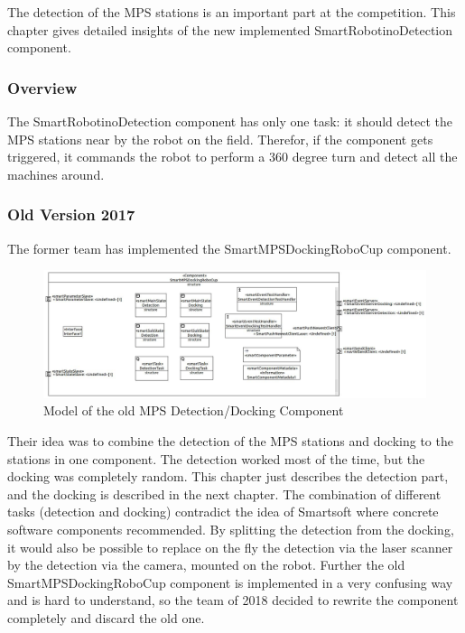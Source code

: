 The detection of the MPS stations is an important part at the competition. This chapter gives detailed insights of the new implemented SmartRobotinoDetection component. 


\subsubsection{Overview}

The SmartRobotinoDetection component has only one task: it should detect the MPS stations near by the robot on the field. Therefor, if the component gets triggered, it commands the robot to perform a 360 degree turn and detect all the machines around.

\subsubsection{Old Version 2017}
The former team has implemented the SmartMPSDockingRoboCup component. 

\begin{figure}[h]
\centering
\includegraphics[scale=0.4]{pic/SmartMPSDockingRoboCup.jpg}
\caption{Model of the old MPS Detection/Docking Component}
\label{fig:dockingold_overview}
\end{figure}

Their idea was to combine the detection of the MPS stations and docking to the stations in one component. The detection worked most of the time, but the docking was completely random. This chapter just describes the detection part, and the docking is described in the next chapter. 
The combination of different tasks (detection and docking) contradict the idea of Smartsoft where concrete software components recommended. By splitting the detection from the docking, it would also be possible to replace on the fly the detection via the laser scanner by the detection via the camera, mounted on the robot.
Further the old SmartMPSDockingRoboCup component is implemented in a very confusing way and is hard to understand, so the team of 2018 decided to rewrite the component completely and discard the old one.


